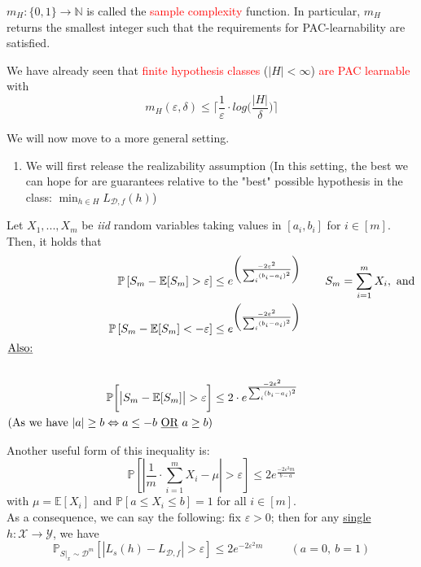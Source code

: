 \documentclass[10pt,a4paper]{article}
\theoremstyle{remark}
\theoremstyle{definition}
\theoremstyle{plain}
\begin{document}
\begin{boxedsubdef}
	$m_H: \{0,1\} \to \mathbb{N}$ is called the \textcolor{red}{sample complexity} function. In particular, $m_H$ returns the smallest integer such that the requirements for PAC-learnability are satisfied.
\end{boxedsubdef}
We have already seen that \textcolor{red}{finite hypothesis classes} ($|H| < \infty$) \textcolor{red}{are PAC learnable} with 
$$ m_H(\varepsilon, \delta) \leq \bigg\lceil\frac{1}{\varepsilon} \cdot log \bigg( \frac{|H|}{\delta}\bigg) \bigg\rceil $$
\newpage

We will now move to a more general setting.
\begin{enumerate}[label*=\protect\fbox{\arabic{enumi}}]
	\item We will first release the realizability assumption (In this setting, the best we can hope for are guarantees relative to the "best" possible hypothesis in the class: $\min_{h \in H}{L_{\mathcal{D}, f}(h)}$)
\end{enumerate}
	\begin{boxeddef}
	Let $X_1, ..., X_m$ be \textit{iid} random variables taking values in $[a_i, b_i]$ for $i \in [m]$. Then, it holds that
	 \begin{align*}
	 	\mathbb{P}\left[S_m - \mathbb{E}[S_m] > \varepsilon\right] 
	 		&\leq e^{\left(\frac{-2 \varepsilon^2}{\sum_{i} (b_i - a_i)^2}\right)} 
	 			&& \hspace{0.4cm} S_m = \sum_{i = 1}^{m} X_i, \text{ and}\\
	 	\mathbb{P}\left[S_m - \mathbb{E}[S_m] < -\varepsilon\right] 
	 		&\leq e^{\left(\frac{-2 \varepsilon^2}{\sum_{i} (b_i - a_i)^2}\right)}\\
	 	\intertext{\underline{Also:}}\\
	 	\mathbb{P}\bigg[\big|S_m - \mathbb{E}[S_m]\big| > \varepsilon\bigg] 
	 		&\leq 2 \cdot e^{\frac{-2 \varepsilon^2}{\sum_{i} (b_i - a_i)^2}}\\
	 	\text{(As we have $|a| \geq b \Leftrightarrow a \leq -b \text{ \underline{OR} } a \geq b$)}
 	\end{align*}


\end{boxeddef}
Another useful form of this inequality is:
$$ 
	\mathbb{P} \left[\left| \frac{1}{m} \cdot \sum_{i = 1}^{m} X_i - \mu \right| > \varepsilon\right] \leq 2 e^{\frac{-2 \varepsilon^2 m}{b-a}} 
$$
with $\mu = \mathbb{E}[X_i]$ and $\mathbb{P}[a \leq X_i \leq b] = 1$ for all $i \in [m]$.\\
 As a consequence, we can say the following: fix $\varepsilon>0$; then for any \colorbox{Apricot}{\underline{single} $h: \mathcal{X} \to \mathcal{Y}$}, we have 
$$ 
	\mathbb{P}_{S|_x \sim \mathcal{D}^m}\left[\left|L_{s}(h) - L_{\mathcal{D}, f}\right| > \varepsilon\right] \leq 2 e^{-2\varepsilon^2 m} \hspace{1cm} (a = 0, \ b = 1)
$$
\end{document}
